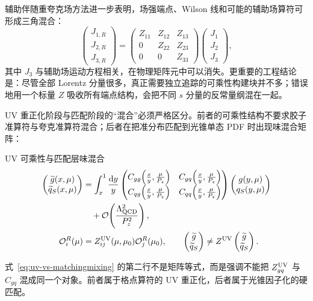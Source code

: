 \documentclass[UTF8,12pt,a4paper,twoside,openany]{ctexbook}
\newcommand{\dd}{\mathrm{d}}
\begin{document}
辅助伴随重夸克场方法进一步表明，场强端点、Wilson 线和可能的辅助场算符可形成三角混合：
\begin{equation}
  \begin{pmatrix}J_{1,R}\\J_{2,R}\\J_{3,R}\end{pmatrix}
  =
  \begin{pmatrix}
    Z_{11} & Z_{12} & Z_{13}\\
    0 & Z_{22} & Z_{23}\\
    0 & 0 & Z_{33}
  \end{pmatrix}
  \begin{pmatrix}J_1\\J_2\\J_3\end{pmatrix},
  \label{eq:triangularmixing}
\end{equation}
其中 \(J_3\) 与辅助场运动方程相关，在物理矩阵元中可以消失。更重要的工程结论是：尽管全部 Lorentz 分量很多，真正需要独立追踪的可乘性构建块并不多；错误地用一个标量 \(Z\) 吸收所有端点结构，会把不同 \(s\) 分量的反常量纲混在一起\cite{LiMaQiu2019,ZhangGluonLaMET2019}。

UV 重正化阶段与匹配阶段的“混合”必须严格区分。前者的可乘性结构不要求胶子准算符与夸克准算符混合；后者在把准分布匹配到光锥单态 PDF 时出现味混合矩阵：
\begin{keyformula}{UV 可乘性与匹配层味混合}
\begin{align}
  \begin{pmatrix}\widetilde g(x,\mu)\\ \widetilde q_S(x,\mu)\end{pmatrix}
  &=\int_x^1\frac{\dd y}{y}
  \begin{pmatrix}
    C_{gg}\!\left(\frac{x}{y},\frac{\mu}{P_z}\right) &
    C_{gq}\!\left(\frac{x}{y},\frac{\mu}{P_z}\right)\\[2pt]
    C_{qg}\!\left(\frac{x}{y},\frac{\mu}{P_z}\right) &
    C_{qq}\!\left(\frac{x}{y},\frac{\mu}{P_z}\right)
  \end{pmatrix}
  \begin{pmatrix}g(y,\mu)\\ q_S(y,\mu)\end{pmatrix}
  \nonumber\\
  &\quad+\mathcal O\!\left(\frac{\Lambda_{\rm QCD}^2}{P_z^2}\right),
  \label{eq:matching2x2}\\
  \mathcal O_i^{R}(\mu)&=Z_{ij}^{\rm UV}(\mu,\mu_0)\mathcal O_j^{R}(\mu_0),
  \qquad
  \begin{pmatrix}\widetilde g\\ \widetilde q_S\end{pmatrix}
  \neq Z^{\rm UV}\begin{pmatrix}\widetilde g\\ \widetilde q_S\end{pmatrix}.
  \label{eq:uv-vs-matchingmixing}
\end{align}
\end{keyformula}
式~\eqref{eq:uv-vs-matchingmixing} 的第二行不是矩阵等式，而是强调不能把 \(Z^{\rm UV}_{gq}\) 与 \(C_{gq}\) 混成同一个对象。前者属于格点算符的 UV 重正化，后者属于光锥因子化的硬匹配。
\end{document}
